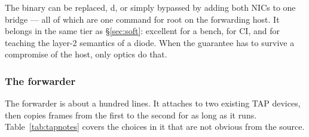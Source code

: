\documentclass[11pt,a4paper]{article}
\begin{document}
\begin{labbox}
The binary can be replaced, d, or simply bypassed by adding both
NICs to one bridge --- all of which are one command for root on the forwarding
host. It belongs in the same tier as \S\ref{sec:soft}: excellent for a bench,
for CI, and for teaching the layer-2 semantics of a diode. When the guarantee
has to survive a compromise of the host, only optics do that.
\end{labbox}

\subsubsection{The forwarder}

The forwarder is about a hundred lines. It attaches to two existing TAP
devices, then copies frames from the first to the second for as long as it
runs. Table~\ref{tab:tapnotes} covers the choices in it that are not obvious
from the source.
\end{document}
